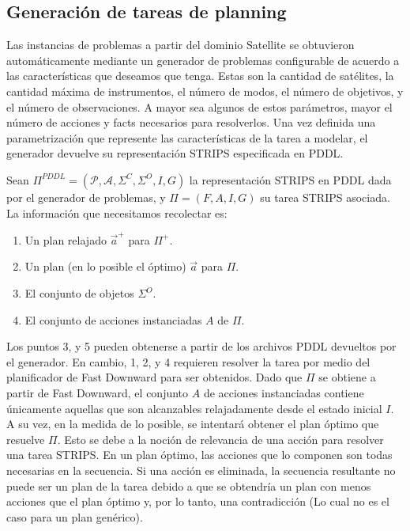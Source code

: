 \subsection{Generación de tareas de planning}
\label{method:data_generation}

Las instancias de problemas a partir del dominio Satellite se obtuvieron
automáticamente mediante un generador de problemas configurable de acuerdo a las
características que deseamos que tenga. Estas son la cantidad de satélites, la
cantidad máxima de instrumentos, el número de modos, el número de objetivos, y
el número de observaciones. A mayor sea algunos de estos parámetros, mayor el
número de acciones y facts necesarios para resolverlos. Una vez definida una
parametrización que represente las características de la tarea a modelar, el
generador devuelve su representación STRIPS especificada en PDDL.


Sean $\Pi^{PDDL} = (\mathcal{P}, \mathcal{A}, \Sigma^{C}, \Sigma^{O}, I, G)$ la
representación STRIPS en PDDL dada por el generador de problemas, y $\Pi = (F,
A, I, G)$ su tarea STRIPS asociada. La información que necesitamos recolectar
es:

\begin{enumerate}
    \item Un plan relajado $\vec{a}^{+}$ para $\Pi^{+}$.
    \item Un plan (en lo posible el óptimo) $\vec{a}$ para $\Pi$.
    \item El conjunto de objetos $\Sigma^{O}$.
    \item El conjunto de acciones instanciadas $A$ de $\Pi$.
\end{enumerate}

Los puntos 3, y 5 pueden obtenerse a partir de los archivos PDDL devueltos por
el generador. En cambio, 1, 2, y 4 requieren resolver la tarea por medio del
planificador de Fast Downward para ser obtenidos. Dado que $\Pi$ se obtiene a
partir de Fast Downward, el conjunto $A$ de acciones instanciadas contiene
únicamente aquellas que son alcanzables relajadamente desde el estado inicial
$I$. A su vez, en la medida de lo posible, se intentará obtener el plan óptimo
que resuelve $\Pi$. Esto se debe a la noción de relevancia de una acción para
resolver una tarea STRIPS. En un plan óptimo, las acciones que lo componen son
todas necesarias en la secuencia. Si una acción es eliminada, la secuencia
resultante no puede ser un plan de la tarea debido a que se obtendría un plan
con menos acciones que el plan óptimo y, por lo tanto, una contradicción (Lo cual
no es el caso para un plan genérico).

